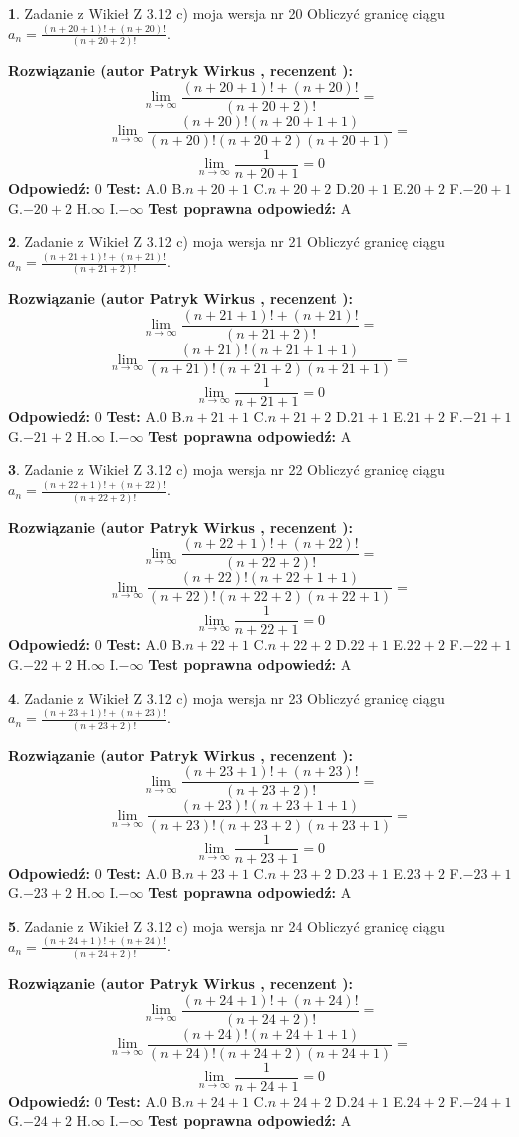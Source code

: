 \documentclass[12pt, a4paper]{article}
\theoremstyle{definition} %
\newtheorem{zad}{}
\newcommand{\zadStart}[1]{\begin{zad}#1\newline}
\newcommand{\zadStop}{\end{zad}}
\newcommand{\rozwStart}[2]{\noindent \textbf{Rozwiązanie (autor #1 , recenzent #2): }\newline}
\newcommand{\rozwStop}{\newline}
\newcommand{\odpStart}{\noindent \textbf{Odpowiedź:}\newline}
\newcommand{\odpStop}{\newline}
\newcommand{\testStart}{\noindent \textbf{Test:}\newline}
\newcommand{\testStop}{\newline}
\newcommand{\kluczStart}{\noindent \textbf{Test poprawna odpowiedź:}\newline}
\newcommand{\kluczStop}{\newline}
\begin{document}
\zadStart{Zadanie z Wikieł Z 3.12 c) moja wersja nr 20}
Obliczyć granicę ciągu $a_{n}=\frac{(n+20+1)!+(n+20)!}{(n+20+2)!}$.
\zadStop
\rozwStart{Patryk Wirkus}{}
$$\lim\limits_{n\to\infty}\frac{(n+20+1)!+(n+20)!}{(n+20+2)!}=$$
$$\lim\limits_{n\to\infty}\frac{(n+20)!(n+20+1+1)}{(n+20)!(n+20+2)(n+20+1)}=$$
$$\lim\limits_{n\to\infty}\frac{1}{n+20+1}= 0$$
\rozwStop
\odpStart
$0$
\odpStop
\testStart
A.$0$
B.$n+20+1$
C.$n+20+2$
D.$20+1$
E.$20+2$
F.$-20+1$
G.$-20+2$
H.$\infty$
I.$-\infty$
\testStop
\kluczStart
A
\kluczStop



\zadStart{Zadanie z Wikieł Z 3.12 c) moja wersja nr 21}
Obliczyć granicę ciągu $a_{n}=\frac{(n+21+1)!+(n+21)!}{(n+21+2)!}$.
\zadStop
\rozwStart{Patryk Wirkus}{}
$$\lim\limits_{n\to\infty}\frac{(n+21+1)!+(n+21)!}{(n+21+2)!}=$$
$$\lim\limits_{n\to\infty}\frac{(n+21)!(n+21+1+1)}{(n+21)!(n+21+2)(n+21+1)}=$$
$$\lim\limits_{n\to\infty}\frac{1}{n+21+1}= 0$$
\rozwStop
\odpStart
$0$
\odpStop
\testStart
A.$0$
B.$n+21+1$
C.$n+21+2$
D.$21+1$
E.$21+2$
F.$-21+1$
G.$-21+2$
H.$\infty$
I.$-\infty$
\testStop
\kluczStart
A
\kluczStop



\zadStart{Zadanie z Wikieł Z 3.12 c) moja wersja nr 22}
Obliczyć granicę ciągu $a_{n}=\frac{(n+22+1)!+(n+22)!}{(n+22+2)!}$.
\zadStop
\rozwStart{Patryk Wirkus}{}
$$\lim\limits_{n\to\infty}\frac{(n+22+1)!+(n+22)!}{(n+22+2)!}=$$
$$\lim\limits_{n\to\infty}\frac{(n+22)!(n+22+1+1)}{(n+22)!(n+22+2)(n+22+1)}=$$
$$\lim\limits_{n\to\infty}\frac{1}{n+22+1}= 0$$
\rozwStop
\odpStart
$0$
\odpStop
\testStart
A.$0$
B.$n+22+1$
C.$n+22+2$
D.$22+1$
E.$22+2$
F.$-22+1$
G.$-22+2$
H.$\infty$
I.$-\infty$
\testStop
\kluczStart
A
\kluczStop



\zadStart{Zadanie z Wikieł Z 3.12 c) moja wersja nr 23}
Obliczyć granicę ciągu $a_{n}=\frac{(n+23+1)!+(n+23)!}{(n+23+2)!}$.
\zadStop
\rozwStart{Patryk Wirkus}{}
$$\lim\limits_{n\to\infty}\frac{(n+23+1)!+(n+23)!}{(n+23+2)!}=$$
$$\lim\limits_{n\to\infty}\frac{(n+23)!(n+23+1+1)}{(n+23)!(n+23+2)(n+23+1)}=$$
$$\lim\limits_{n\to\infty}\frac{1}{n+23+1}= 0$$
\rozwStop
\odpStart
$0$
\odpStop
\testStart
A.$0$
B.$n+23+1$
C.$n+23+2$
D.$23+1$
E.$23+2$
F.$-23+1$
G.$-23+2$
H.$\infty$
I.$-\infty$
\testStop
\kluczStart
A
\kluczStop



\zadStart{Zadanie z Wikieł Z 3.12 c) moja wersja nr 24}
Obliczyć granicę ciągu $a_{n}=\frac{(n+24+1)!+(n+24)!}{(n+24+2)!}$.
\zadStop
\rozwStart{Patryk Wirkus}{}
$$\lim\limits_{n\to\infty}\frac{(n+24+1)!+(n+24)!}{(n+24+2)!}=$$
$$\lim\limits_{n\to\infty}\frac{(n+24)!(n+24+1+1)}{(n+24)!(n+24+2)(n+24+1)}=$$
$$\lim\limits_{n\to\infty}\frac{1}{n+24+1}= 0$$
\rozwStop
\odpStart
$0$
\odpStop
\testStart
A.$0$
B.$n+24+1$
C.$n+24+2$
D.$24+1$
E.$24+2$
F.$-24+1$
G.$-24+2$
H.$\infty$
I.$-\infty$
\testStop
\kluczStart
A
\kluczStop
\end{document}
